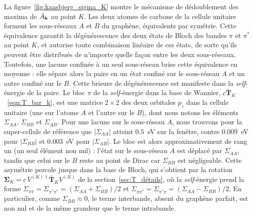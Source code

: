 La figure~\ref{fig:kaasbjerg_sigma_K} montre le mécanisme de dédoublement des maxima de $\bar A_{\mathbf{k}}$ au point $K$. Les deux atomes de carbone de la cellule unitaire forment les sous-réseaux $A$ et $B$ du graphène, équivalents par symétrie. Cette équivalence garantit la dégénérescence des deux états de Bloch des bandes $\pi$ et $\pi^*$ au point $K$, et autorise toute combinaison linéaire de ces états, de sorte qu'ils peuvent être distribués de n'importe quelle façon entre les deux sous-réseaux. Toutefois, une lacune confinée à un seul sous-réseau brise cette équivalence en moyenne : elle sépare alors la paire en un état confiné sur le sous-réseau $A$ et un autre confiné sur le $B$. Cette brisure de dégénérescence est manifeste dans la \textit{self}-énergie de la paire. Le bloc $\pi$ de la \textit{self}-énergie dans la base de Wannier, $c\bar{\bm T}_K$~\eqref{eqn:T_bar_k}, est une matrice $2\times 2$ des deux orbitales $p_z$ dans la cellule unitaire (une sur l'atome $A$ et l'autre sur le $B$), dont nous notons les éléments $\Sigma_{AA}$, $\Sigma_{BB}$ et $\Sigma_{AB}$. Pour une lacune sur le sous-réseau $A$, nous trouvons pour la super-cellule de référence que $|\Sigma_{AA}|$ atteint $0.5$~eV sur la fenêtre, contre $0.009$~eV pour $|\Sigma_{BB}|$ et $0.003$~eV pour $|\Sigma_{AB}|$. Le bloc est alors approximativement de rang un (un seul élément non nul) : l'état sur le sous-réseau $A$ est déplacé par $\Sigma_{AA}$, tandis que celui sur le $B$ reste au point de Dirac car $\Sigma_{BB}$ est négligeable. Cette asymétrie percole jusque dans la base de Bloch, qui s'obtient par la rotation $\bm\Sigma_K = c\,V^{(K)\dag}\bar{\bm T}_K V^{(K)}$ de la section~\ref{sec:T_détails}, où la \textit{self}-énergie prend la forme $\Sigma_{\pi\pi}=\Sigma_{\pi^*\pi^*}=(\Sigma_{AA}+\Sigma_{BB})/2$ et $\Sigma_{\pi\pi^*}=\Sigma_{\pi^*\pi}=(\Sigma_{AA}-\Sigma_{BB})/2$. En particulier, comme $\Sigma_{BB}\approx 0$, le terme interbande, absent du graphène parfait, est non nul et de la même grandeur que le terme intrabande.

\begin{table}[htbp]
    \centering
    \caption[Comparaisons avec Kaasbjerg.]{Comparaisons avec Kaasbjerg~\cite{kaasbjergAtomisticMatrixTheory2020} pour une lacune dans le graphène. Nous utilisons la super-cellule de référence $9\times 9$ et nos deux conventions de référence : brute (celle qui correspond à Kaasbjerg, le vide) et alignée. Les grandeurs comparées sont : les éléments de matrice intravallée des bandes $\pi$ et $\pi^*$ près de $K$, moyennés sur un disque de $0.15$~\AA$^{-1}$ autour de $K$ pour l'état initial $K+\delta\hat{\mathbf{x}}$, comme à la section~\ref{sec:M_results} ; la position, la hauteur et la largeur à mi-hauteur du maximum de $\bar\rho-\rho_0$ en états par unité d'énergie par cellule unitaire, avec $\eta_G=50$~meV sur une grille de $600^2$ points pour $\bar\rho$ et $\rho_0$ ; et l'écart des deux maxima de la fonction spectrale $\bar A_K$, aux concentrations $c=0.1$ et $1~\%$ avec $\eta_G=25$~meV. Les valeurs dans la colonne de Kaasbjerg sont lues sur sa figure 3 et numérisées sur ses figures 13 et 14. Nous utilisons une grille d'énergie $\varepsilon_j$ de pas $2.5$~meV.}
    \label{tab:kaasbjerg}
    
\end{table}

